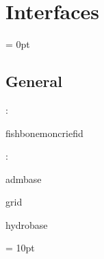 
\section{Interfaces} 


\parskip = 0pt

\vspace{3mm} \subsection*{General}

: 

fishbonemoncriefid
\vspace{2mm}

: 

admbase

grid

hydrobase
\vspace{2mm}

\vspace{5mm}\parskip = 10pt 
